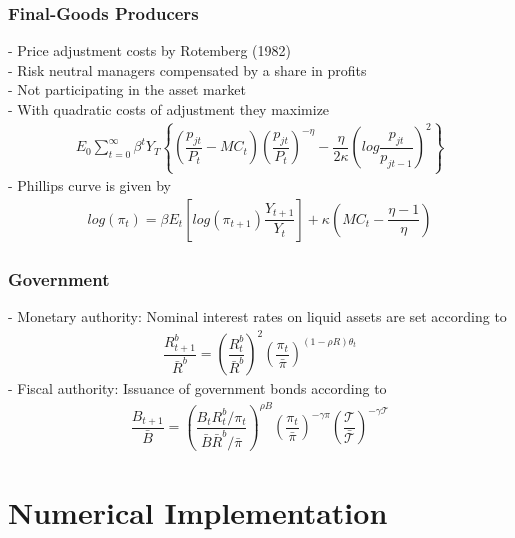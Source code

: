\documentclass[titlepage]{\econtex}
\begin{document}
\hypertarget{Final-Goods Producers}{}
\subsubsection{Final-Goods Producers}

- Price adjustment costs by Rotemberg (1982)\\
- Risk neutral managers compensated by a share in profits\\
- Not participating in the asset market\\
- With quadratic costs of adjustment they maximize\\
\begin{align}
   E_{0} \sum_{t=0}^{\infty} \beta^{t} Y_{T} \left \lbrace \left(\dfrac{p_{jt}}{P_{t}}-MC_{t}\right)\left(\dfrac{p_{jt}}{P_{t}}\right )^{-\eta} - \dfrac{\eta}{2 \kappa} \left (log\dfrac{p_{jt}}{p_{jt-1}} \right)^{2} \right \rbrace 
  \end{align}
  - Phillips curve is given by\\
  \begin{align}
    log(\pi_{t})=\beta E_{t}\left [log\left(\pi_{t+1}\right)\dfrac{Y_{t+1}}{Y_{t}}\right]+ \kappa\left (MC_{t} - \dfrac{\eta-1}{\eta} \right)
   \end{align}
  
\hypertarget{Government}{}
\subsubsection{Government}

- Monetary authority: Nominal interest rates on liquid assets  are set according to\\
\begin{align}
  \dfrac{R_{t+1}^{b}}{\bar{R}^{b}} =\left( \dfrac{R_{t}^{b}}{\bar{R}^{b}}\right)^{2}\left(\dfrac{\pi_{t}}{\bar{\pi}}\right)^{(1-\rho R)\theta_{t}}
  \end{align}  
  - Fiscal authority: Issuance of government bonds according to\\
  \begin{align}
\dfrac{B_{t+1}}{\bar{B}}= \left( \dfrac{B_{t}R_{t}^{b}/ \pi_{t}}{\bar{B}\bar{R}^{b}/ \bar{\pi}}\right)^{\rho B} \left(\dfrac{\pi_{t}}{\bar{\pi}} \right)^{-\gamma \pi} \left( \dfrac{\mathcal{T}}{\bar{\mathcal{T}}} \right)^{-\gamma \mathcal{T}}
\end{align}

\hypertarget{Numerical Implementation}{}
\section{Numerical Implementation}
\end{document}
